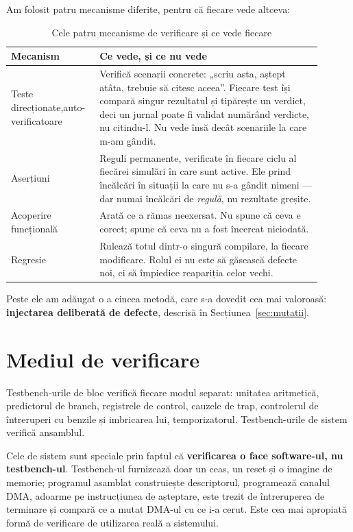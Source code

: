 \documentclass[11pt,openany]{report}
\begin{document}
Am folosit patru mecanisme diferite, pentru că fiecare vede altceva:

\begin{table}[H]
\centering
\caption{Cele patru mecanisme de verificare și ce vede fiecare}
\label{tab:verifstrat}
\small
\begin{tabular}{@{}L{0.23\linewidth}L{0.67\linewidth}@{}}
\toprule
\textbf{Mecanism} & \textbf{Ce vede, și ce nu vede} \\
\midrule
Teste direcționate,\newline auto-verificatoare &
  Verifică scenarii concrete: „scriu asta, aștept atâta, trebuie să citesc
  aceea”. Fiecare test își compară singur rezultatul și tipărește un verdict, deci
  un jurnal poate fi validat numărând verdicte, nu citindu-l. Nu vede însă decât
  scenariile la care m-am gândit. \\
\addlinespace
Aserțiuni &
  Reguli permanente, verificate în fiecare ciclu al fiecărei simulări în care
  sunt active. Ele prind încălcări în situații la care nu s-a gândit nimeni ---
  dar numai încălcări de \emph{regulă}, nu rezultate greșite. \\
\addlinespace
Acoperire funcțională &
  Arată ce a rămas neexersat. Nu spune că ceva e corect; spune că ceva nu a fost
  încercat niciodată. \\
\addlinespace
Regresie &
  Rulează totul dintr-o singură compilare, la fiecare modificare. Rolul ei nu
  este să găsească defecte noi, ci să împiedice reapariția celor vechi. \\
\bottomrule
\end{tabular}
\end{table}

Peste ele am adăugat o a cincea metodă, care s-a dovedit cea mai valoroasă:
\textbf{injectarea deliberată de defecte}, descrisă în
Secțiunea~\ref{sec:mutatii}.

\section{Mediul de verificare}

Testbench-urile de bloc verifică fiecare modul separat: unitatea aritmetică,
predictorul de branch, registrele de control, cauzele de trap, controlerul de
întreruperi cu benzile și imbricarea lui, temporizatorul. Testbench-urile de
sistem verifică ansamblul.

Cele de sistem sunt speciale prin faptul că \textbf{verificarea o face
software-ul, nu testbench-ul}. Testbench-ul furnizează doar un ceas, un reset și
o imagine de memorie; programul asamblat construiește descriptorul, programează
canalul DMA, adoarme pe instrucțiunea de așteptare, este trezit de întreruperea
de terminare și compară ce a mutat DMA-ul cu ce i-a cerut. Este cea mai apropiată
formă de verificare de utilizarea reală a sistemului.
\end{document}
